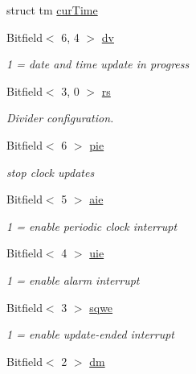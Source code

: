 \begin{DoxyCompactItemize}
\begin{tabbing}
\end{tabbing}\item 
struct tm \hyperlink{classMC146818_a1fa96dc80ff12927216cb2ce72306e55}{curTime}
\item 
Bitfield$<$ 6, 4 $>$ \hyperlink{classMC146818_a6cb58630092effe3e8ef2d674d7a3d1a}{dv}
\begin{DoxyCompactList}\small\item\em 1 = date and time update in progress \item\end{DoxyCompactList}\item 
Bitfield$<$ 3, 0 $>$ \hyperlink{classMC146818_af889c7c5198ff826946778bb663d2da5}{rs}
\begin{DoxyCompactList}\small\item\em Divider configuration. \item\end{DoxyCompactList}\item 
Bitfield$<$ 6 $>$ \hyperlink{classMC146818_ab481b76028ca7f38eef64a2a0df7daa9}{pie}
\begin{DoxyCompactList}\small\item\em stop clock updates \item\end{DoxyCompactList}\item 
Bitfield$<$ 5 $>$ \hyperlink{classMC146818_a074fd4d27a675086372d4d0f43e96c3c}{aie}
\begin{DoxyCompactList}\small\item\em 1 = enable periodic clock interrupt \item\end{DoxyCompactList}\item 
Bitfield$<$ 4 $>$ \hyperlink{classMC146818_ad8be3702ba014f17744bad97962b3942}{uie}
\begin{DoxyCompactList}\small\item\em 1 = enable alarm interrupt \item\end{DoxyCompactList}\item 
Bitfield$<$ 3 $>$ \hyperlink{classMC146818_a91777eb5d8187720f48d7d5a193c7295}{sqwe}
\begin{DoxyCompactList}\small\item\em 1 = enable update-\/ended interrupt \item\end{DoxyCompactList}\item 
Bitfield$<$ 2 $>$ \hyperlink{classMC146818_a0c41402e021fa90f547adf9392abcc8d}{dm}

\end{DoxyCompactItemize}
